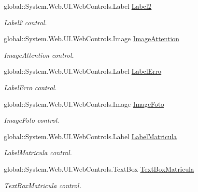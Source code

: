 \begin{DoxyCompactItemize}
\item 
global::System.Web.UI.WebControls.Label \hyperlink{class_sistema_r_h_1_1_cadastro_docs_a61437f8fee7b34017fcb089f43e0e0aa}{Label2}
\begin{DoxyCompactList}\small\item\em Label2 control. \item\end{DoxyCompactList}\item 
global::System.Web.UI.WebControls.Image \hyperlink{class_sistema_r_h_1_1_cadastro_docs_a3713658dee32d47772744bc93a4a9672}{ImageAttention}
\begin{DoxyCompactList}\small\item\em ImageAttention control. \item\end{DoxyCompactList}\item 
global::System.Web.UI.WebControls.Label \hyperlink{class_sistema_r_h_1_1_cadastro_docs_a33caea05605b414e0ea06b9220399f61}{LabelErro}
\begin{DoxyCompactList}\small\item\em LabelErro control. \item\end{DoxyCompactList}\item 
global::System.Web.UI.WebControls.Image \hyperlink{class_sistema_r_h_1_1_cadastro_docs_a748c60b96b57bea687b23ee1d0645437}{ImageFoto}
\begin{DoxyCompactList}\small\item\em ImageFoto control. \item\end{DoxyCompactList}\item 
global::System.Web.UI.WebControls.Label \hyperlink{class_sistema_r_h_1_1_cadastro_docs_a1d18bcded11290fd597a761a4f1bd9bb}{LabelMatricula}
\begin{DoxyCompactList}\small\item\em LabelMatricula control. \item\end{DoxyCompactList}\item 
global::System.Web.UI.WebControls.TextBox \hyperlink{class_sistema_r_h_1_1_cadastro_docs_a1a75e3c9e88df9078ea5070b6f6c6beb}{TextBoxMatricula}
\begin{DoxyCompactList}\small\item\em TextBoxMatricula control. \item\end{DoxyCompactList}\item 

\end{DoxyCompactItemize}
